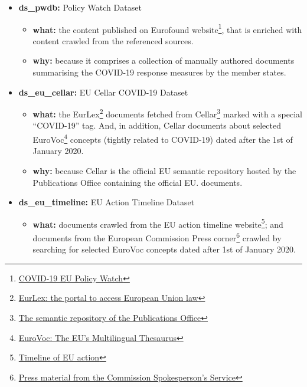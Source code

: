 \begin{itemize}
	\item \textbf{ds\_pwdb:} Policy Watch Dataset 
        \begin{itemize}
        	\item \textbf{what:} the content published on Eurofound website\footnote{ \href{https://www.eurofound.europa.eu/data/covid-19-eu-policywatch}{COVID-19 EU Policy Watch}}, that is enriched with content crawled from the referenced sources.
        	\item \textbf{why:} because it comprises a collection of manually authored documents summarising the COVID-19 response measures by the member states.
        \end{itemize}
	\item \textbf{ds\_eu\_cellar:} EU Cellar COVID-19 Dataset 
        \begin{itemize}
        	\item \textbf{what:} the EurLex\footnote{ \href{https://eur-lex.europa.eu/homepage.html}{EurLex: the portal to access European Union law} } documents fetched from Cellar\footnote{ \href{https://op.europa.eu/en/publication-detail/-/publication/50ecce27-857e-11e8-ac6a-01aa75ed71a1}{The semantic repository of the Publications Office} } marked with a special ``COVID-19'' tag. And, in addition, Cellar documents about selected EuroVoc\footnote{ \href{https://op.europa.eu/en/web/eu-vocabularies/dataset/-/resource?uri=http://publications.europa.eu/resource/dataset/eurovoc}{EuroVoc: The EU's Multilingual Thesaurus} } concepts (tightly related to COVID-19) dated after the 1st of January 2020.
        	\item \textbf{why:} because Cellar is the official EU semantic repository hosted by the Publications Office containing the official EU. documents. 
        \end{itemize}
	\item \textbf{ds\_eu\_timeline:} EU Action Timeline Dataset 
        \begin{itemize}
        	\item \textbf{what:} documents crawled from the EU action timeline website\footnote{ \href{https://ec.europa.eu/info/live-work-travel-eu/coronavirus-response/timeline-eu-action_en}{Timeline of EU action} }; and documents from the European Commission Press corner\footnote{ \href{https://ec.europa.eu/commission/presscorner/home/en}{Press material from the Commission Spokesperson's Service} } crawled by searching for selected EuroVoc concepts dated after 1st of January 2020.

\end{itemize}
\end{itemize}
